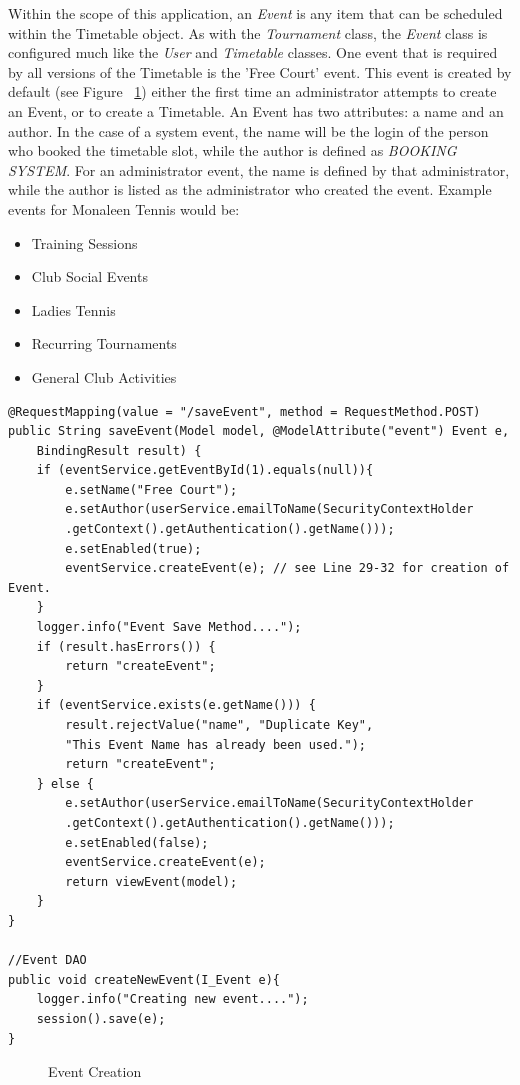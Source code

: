 Within the scope of this application, an \textit{Event} is any item that can be scheduled within the Timetable object. As with the \textit{Tournament} class, the \textit{Event} class is configured much like the \textit{User} and \textit{Timetable} classes. One event that is required by all versions of the Timetable is the 'Free Court' event. This event is created by default (see Figure ~\ref{fig:createEvent}) either the first time an administrator attempts to create an Event, or to create a Timetable. An Event has two attributes: a name and an author. In the case of a system event, the name will be the login of the person who booked the timetable slot, while the author is defined as \textit{BOOKING SYSTEM}. For an administrator event, the name is defined by that administrator, while the author is listed as the administrator who created the event. Example events for Monaleen Tennis would be:

\begin{itemize}
\item Training Sessions
\item Club Social Events
\item Ladies Tennis
\item Recurring Tournaments
\item General Club Activities
\end{itemize}

\begin{lstlisting}
@RequestMapping(value = "/saveEvent", method = RequestMethod.POST)
public String saveEvent(Model model, @ModelAttribute("event") Event e,
	BindingResult result) {
	if (eventService.getEventById(1).equals(null)){
		e.setName("Free Court");
		e.setAuthor(userService.emailToName(SecurityContextHolder
		.getContext().getAuthentication().getName()));
		e.setEnabled(true);
		eventService.createEvent(e); // see Line 29-32 for creation of Event.
	}
	logger.info("Event Save Method....");
	if (result.hasErrors()) {
		return "createEvent";
	}
	if (eventService.exists(e.getName())) {
		result.rejectValue("name", "Duplicate Key",
		"This Event Name has already been used.");
		return "createEvent";
	} else {
		e.setAuthor(userService.emailToName(SecurityContextHolder
		.getContext().getAuthentication().getName()));
		e.setEnabled(false);
		eventService.createEvent(e);
		return viewEvent(model);
	}
}

//Event DAO 
public void createNewEvent(I_Event e){
	logger.info("Creating new event....");
	session().save(e);
}
\end{lstlisting}
\begin{figure}[H]
\caption{Event Creation}
\label{fig:createEvent}
\end{figure}

